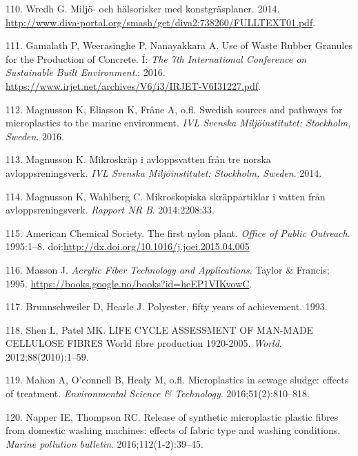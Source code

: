 \documentclass[icelandic,]{book}
\begin{document}
\leavevmode\hypertarget{ref-Wredh2014}{}%
110. Wredh G. Miljö- och hälsorisker med konstgräsplaner. 2014. \url{http://www.diva-portal.org/smash/get/diva2:738260/FULLTEXT01.pdf}.

\leavevmode\hypertarget{ref-Gamalath2016}{}%
111. Gamalath P, Weerasinghe P, Nanayakkara A. Use of Waste Rubber Granules for the Production of Concrete. Í: \emph{The 7th International Conference on Sustainable Built Environment}.; 2016. \url{https://www.irjet.net/archives/V6/i3/IRJET-V6I31227.pdf}.

\leavevmode\hypertarget{ref-magnusson2016swedish}{}%
112. Magnusson K, Eliasson K, Fråne A, o.fl. Swedish sources and pathways for microplastics to the marine environment. \emph{IVL Svenska Miljöinstitutet: Stockholm, Sweden}. 2016.

\leavevmode\hypertarget{ref-magnusson2014mikroskrap}{}%
113. Magnusson K. Mikroskräp i avloppsvatten från tre norska avloppsreningsverk. \emph{IVL Svenska Miljöinstitutet: Stockholm, Sweden}. 2014.

\leavevmode\hypertarget{ref-magnusson2014mikroskopiska}{}%
114. Magnusson K, Wahlberg C. Mikroskopiska skräppartiklar i vatten från avloppsreningsverk. \emph{Rapport NR B}. 2014;2208:33.

\leavevmode\hypertarget{ref-AmericanChemicalSociety1995}{}%
115. American Chemical Society. The first nylon plant. \emph{Office of Public Outreach}. 1995:1--8. doi:\href{https://doi.org/http://dx.doi.org/10.1016/j.joei.2015.04.005}{http://dx.doi.org/10.1016/j.joei.2015.04.005}

\leavevmode\hypertarget{ref-masson1995acrylic}{}%
116. Masson J. \emph{Acrylic Fiber Technology and Applications}. Taylor \& Francis; 1995. \url{https://books.google.no/books?id=heEP1VIKvowC}.

\leavevmode\hypertarget{ref-brunnschweiler1993polyester}{}%
117. Brunnschweiler D, Hearle J. Polyester, fifty years of achievement. 1993.

\leavevmode\hypertarget{ref-Shen2012}{}%
118. Shen L, Patel MK. LIFE CYCLE ASSESSMENT OF MAN-MADE CELLULOSE FIBRES World fibre production 1920-2005. \emph{World}. 2012;88(2010):1--59.

\leavevmode\hypertarget{ref-mahon2016microplastics}{}%
119. Mahon A, O'connell B, Healy M, o.fl. Microplastics in sewage sludge: effects of treatment. \emph{Environmental Science \& Technology}. 2016;51(2):810--818.

\leavevmode\hypertarget{ref-napper2016release}{}%
120. Napper IE, Thompson RC. Release of synthetic microplastic plastic fibres from domestic washing machines: effects of fabric type and washing conditions. \emph{Marine pollution bulletin}. 2016;112(1-2):39--45.
\end{document}
